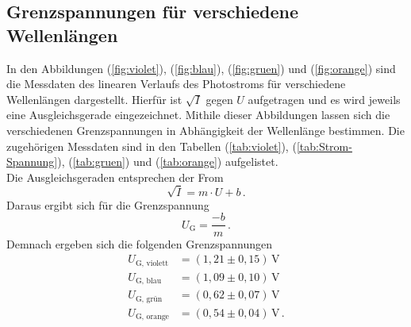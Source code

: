 \subsection{Grenzspannungen für verschiedene Wellenlängen}
\label{sec:Grenzspannungen}
In den Abbildungen (\ref{fig:violet}), (\ref{fig:blau}), (\ref{fig:gruen}) und (\ref{fig:orange}) sind die Messdaten des linearen Verlaufs
des Photostroms für verschiedene Wellenlängen dargestellt. Hierfür ist $\sqrt{I}$ gegen $U$ aufgetragen und es wird jeweils eine Ausgleichsgerade
eingezeichnet. Mithile dieser Abbildungen lassen sich die verschiedenen Grenzspannungen in Abhängigkeit der Wellenlänge bestimmen. Die zugehörigen Messdaten
sind in den Tabellen (\ref{tab:violet}), (\ref{tab:Strom-Spannung}), (\ref{tab:gruen}) und (\ref{tab:orange}) aufgelistet.\\
Die Ausgleichsgeraden entsprechen der From $$\sqrt{I} = m \cdot U + b\,.$$ Daraus ergibt sich für die Grenzspannung $$U_{\text{G}} = \frac{-b}{m}\,.$$
Demnach ergeben sich die folgenden Grenzspannungen 
\begin{align*}
    U_{\text{G, violett}} &= (1,21\pm0,15)\,\unit{\volt}\\
    U_{\text{G, blau}} &= (1,09\pm0,10)\,\unit{\volt}\\
    U_{\text{G, grün}} &= (0,62\pm0,07)\,\unit{\volt}\\
    U_{\text{G, orange}} &= (0,54\pm0,04)\,\unit{\volt}\,.\\
\end{align*}

